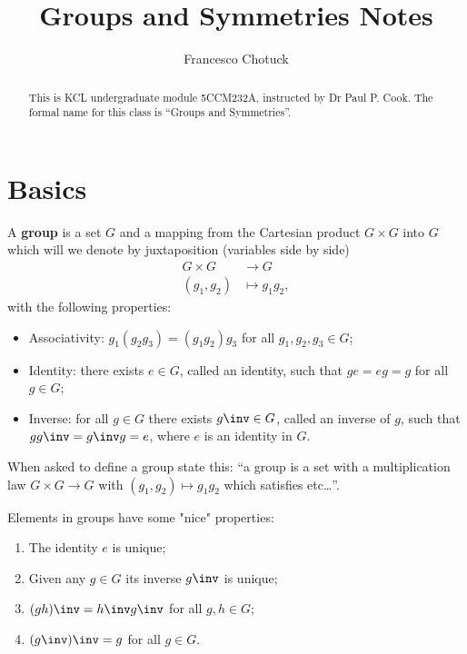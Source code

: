 \documentclass[12pt, a4paper]{article}
\title{Groups and Symmetries Notes}
\date{}
\author{Francesco Chotuck}
\begin{document}
\maketitle

\begin{abstract}
    This is KCL undergraduate module 5CCM232A, instructed by Dr Paul P. Cook. The formal name for this class is ``Groups and Symmetries''.
\end{abstract}
    
\tableofcontents

\pagebreak



\section{Basics}

\begin{definition}
    A \textbf{group} is a set $G$ and a mapping from the Cartesian product $G \times G$ into $G$ which will we denote by juxtaposition (variables side by side) \[\begin{aligned}
        G \times G &\to G \\
        (g_1,g_2) &\mapsto g_1g_2,
    \end{aligned}\] with the following properties: 
    \begin{itemize}
        \item Associativity: \(g_1(g_2g_3)=(g_1g_2)g_3\) for all \(g_1,g_2,g_3 \in G\);
        \item Identity: there exists \(e\in G\), called an identity, such that \(ge=eg=g\) for all \(g\in G\);
        \item Inverse: for all \(g \in G\) there exists \(g \inv \in G\), called an inverse of \(g\), such that \(gg \inv=g \inv g=e\), where \(e\) is an identity in \(G\).
    \end{itemize}
\end{definition}

\begin{mdremark}
    When asked to define a group state this: ``a group is a set with a multiplication law \(G \times G \to G\) with \((g_1,g_2) \mapsto g_1g_2\) which satisfies etc\dots''.
\end{mdremark}

Elements in groups have some "nice" properties:

\begin{enumerate}
    \item The identity \(e\) is unique;
    \item Given any \(g\in G\) its inverse \(g \inv\) is unique;
    \item \((gh)\inv = h\inv g\inv\) for all \(g,h \in G\);
    \item \((g\inv)\inv=g\) for all \(g\in G\).
\end{enumerate}
\end{document}
